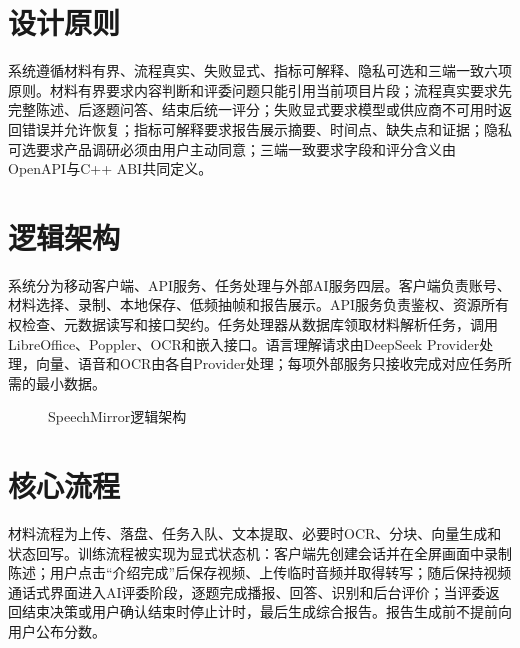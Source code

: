 \section{设计原则}
系统遵循材料有界、流程真实、失败显式、指标可解释、隐私可选和三端一致六项原则。材料有界要求内容判断和评委问题只能引用当前项目片段；流程真实要求先完整陈述、后逐题问答、结束后统一评分；失败显式要求模型或供应商不可用时返回错误并允许恢复；指标可解释要求报告展示摘要、时间点、缺失点和证据；隐私可选要求产品调研必须由用户主动同意；三端一致要求字段和评分含义由OpenAPI与C++ ABI共同定义。

\section{逻辑架构}
系统分为移动客户端、API服务、任务处理与外部AI服务四层。客户端负责账号、材料选择、录制、本地保存、低频抽帧和报告展示。API服务负责鉴权、资源所有权检查、元数据读写和接口契约。任务处理器从数据库领取材料解析任务，调用LibreOffice、Poppler、OCR和嵌入接口。语言理解请求由DeepSeek Provider处理，向量、语音和OCR由各自Provider处理；每项外部服务只接收完成对应任务所需的最小数据。

\begin{figure}[H]
\centering
{}
\caption{SpeechMirror逻辑架构}
\end{figure}

\section{核心流程}
材料流程为上传、落盘、任务入队、文本提取、必要时OCR、分块、向量生成和状态回写。训练流程被实现为显式状态机：客户端先创建会话并在全屏画面中录制陈述；用户点击“介绍完成”后保存视频、上传临时音频并取得转写；随后保持视频通话式界面进入AI评委阶段，逐题完成播报、回答、识别和后台评价；当评委返回结束决策或用户确认结束时停止计时，最后生成综合报告。报告生成前不提前向用户公布分数。

